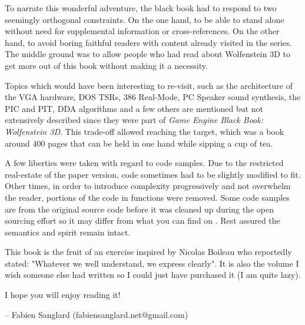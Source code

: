  To narrate this wonderful adventure, the black book had to respond to two seemingly orthogonal constraints. On the one hand, to be able to stand alone without need for supplemental information or cross-references. On the other hand, to avoid boring faithful readers with content already visited in the series. The middle ground was to allow people who had read about Wolfenstein 3D to get more out of this book without making it a necessity.\\
 \par
 Topics which would have been interesting to re-visit, such as the architecture of the VGA hardware, DOS TSRs, 386 Real-Mode, PC Speaker sound synthesis, the PIC and PIT, DDA algorithms and a few others are mentioned but not extensively described since they were part of \textit{Game Engine Black Book: Wolfenstein 3D}. This trade-off allowed reaching the target, which was a book around 400 pages that can be held in one hand while sipping a cup of tea.\\
\par
A few liberties were taken with regard to code samples. Due to the restricted real-estate of the paper version, code sometimes had to be slightly modified to fit. Other times, in order to introduce complexity progressively and not overwhelm the reader, portions of the code in functions were removed. Some code samples are from the original source code before it was cleaned up during the open sourcing effort so it may differ from what you can find on . Rest assured the semantics and spirit remain intact.\\
\par 
This book is the fruit of an exercise inspired by Nicolas Boileau who reportedly stated: "Whatever we well understand, we express clearly". It is also the volume I wish someone else had written so I could just have purchased it (I am quite lazy).\\
\par
I hope you will enjoy reading it!\\
\par
-- Fabien Sanglard (fabiensanglard.net@gmail.com)
